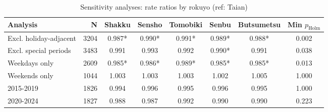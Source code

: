 
\begin{table}[htbp]
\centering
\caption{Sensitivity analyses: rate ratios by rokuyo (ref: Taian)}
\label{tab:sensitivity}
\begin{tabular}{l r c c c c c c}
\toprule
Analysis & N & Shakku & Sensho & Tomobiki & Senbu & Butsumetsu & Min $p_\mathrm{Holm}$ \\
\midrule
Excl. holiday-adjacent & 3204 & 0.987* & 0.990* & 0.991* & 0.989* & 0.988* & 0.002 \\
Excl. special periods & 3483 & 0.991 & 0.993 & 0.992 & 0.990* & 0.991 & 0.038 \\
Weekdays only & 2609 & 0.985* & 0.986* & 0.989* & 0.985* & 0.985* & 0.013 \\
Weekends only & 1044 & 1.003 & 1.003 & 1.003 & 1.002 & 1.005 & 1.000 \\
2015-2019 & 1826 & 0.994 & 0.996 & 0.995 & 0.996 & 0.995 & 1.000 \\
2020-2024 & 1827 & 0.988 & 0.987 & 0.992 & 0.990 & 0.990 & 0.223 \\
\bottomrule
\end{tabular}
\end{table}